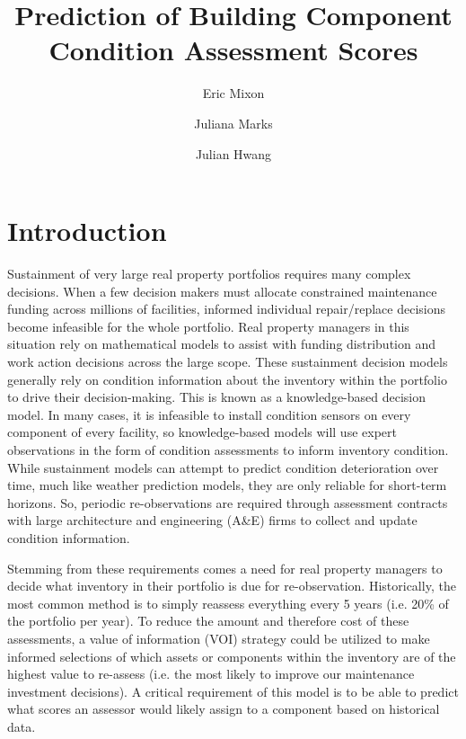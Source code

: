 \documentclass[Journal,letterpaper,NoPageNumbers,NoLineNumbers]{ascelike-new}
\begin{document}
\title{Prediction of Building Component Condition Assessment Scores}

\author[1]{Eric Mixon}
\author[2]{Juliana Marks}
\author[3]{Julian Hwang}

\maketitle

\section{Introduction}

Sustainment of very large real property portfolios requires many complex decisions. When a few decision makers must allocate constrained maintenance funding across millions of facilities, informed individual repair/replace decisions become infeasible for the whole portfolio. Real property managers in this situation rely on mathematical models to assist with funding distribution and work action decisions across the large scope.  These sustainment decision models generally rely on condition information about the inventory within the portfolio to drive their decision-making. This is known as a knowledge-based decision model.  In many cases, it is infeasible to install condition sensors on every component of every facility, so knowledge-based models will use expert observations in the form of condition assessments to inform inventory condition.  While sustainment models can attempt to predict condition deterioration over time, much like weather prediction models, they are only reliable for short-term horizons. So, periodic re-observations are required through assessment contracts with large architecture and engineering (A\&E) firms to collect and update condition information.  

Stemming from these requirements comes a need for real property managers to decide what inventory in their portfolio is due for re-observation.  Historically, the most common method is to simply reassess everything every 5 years (i.e. 20\% of the portfolio per year).  To reduce the amount and therefore cost of these assessments, a value of information (VOI) strategy could be utilized to make informed selections of which assets or components within the inventory are of the highest value to re-assess (i.e. the most likely to improve our maintenance investment decisions).  A critical requirement of this model is to be able to predict what scores an assessor would likely assign to a component based on historical data. 
\end{document}
